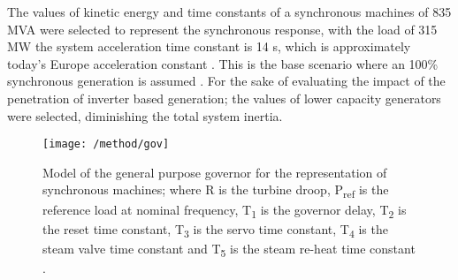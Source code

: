 The values of kinetic energy and time constants of a synchronous machines of 835 MVA were selected to represent the synchronous response, with the load of 315 MW the system acceleration time constant is 14 s, which is approximately today’s Europe acceleration constant \cite{ENTSOE.2016}. This is the base scenario where an 100\% synchronous generation is assumed . For the sake of evaluating the impact of the penetration of inverter based generation; the values of lower capacity generators were selected, diminishing the total system inertia.\\%
\begin{figure}[h]
	\centering
	\texttt{[image: /method/gov]}
	\caption{Model of the general purpose governor for the representation of synchronous machines; where R is the turbine droop, P\textsubscript{ref} is the reference load at nominal frequency, T\textsubscript{1} is the governor delay, T\textsubscript{2} is the reset time constant, T\textsubscript{3} is the servo time constant, T\textsubscript{4} is the steam valve time constant and T\textsubscript{5} is the steam re-heat time constant \cite{Anderson.2002}.}
	\label{fig:gov}
\end{figure}

